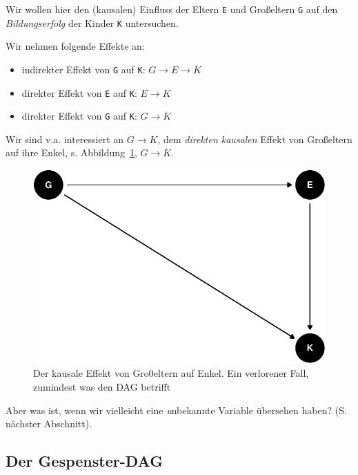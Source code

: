 \documentclass[
  a4paper,
  DIV=11]{scrreprt}
\providecommand{\tightlist}{%
  \setlength{\itemsep}{0pt}\setlength{\parskip}{0pt}}\usepackage{longtable,booktabs,array}
\theoremstyle{definition}
\theoremstyle{remark}
\begin{document}
Wir wollen hier den (kausalen) Einfluss der Eltern \texttt{E} und
Großeltern \texttt{G} auf den \emph{Bildungserfolg} der Kinder
\texttt{K} untersuchen.

Wir nehmen folgende Effekte an:

\begin{itemize}
\tightlist
\item
  indirekter Effekt von \texttt{G} auf \texttt{K}:
  \(G \rightarrow E \rightarrow K\)
\item
  direkter Effekt von \texttt{E} auf \texttt{K}: \(E \rightarrow K\)
\item
  direkter Effekt von \texttt{G} auf \texttt{K}: \(G \rightarrow K\)
\end{itemize}

Wir sind v.a. interessiert an \(G \rightarrow K\), dem \emph{direkten
kausalen} Effekt von Großeltern auf ihre Enkel, s.
Abbildung~\ref{fig-dag-grannies}, \(G \rightarrow K\).

\begin{figure}

{\centering \includegraphics{./kausal_files/figure-pdf/fig-dag-grannies-1.pdf}

}

\caption{\label{fig-dag-grannies}Der kausale Effekt von Gro0eltern auf
Enkel. Ein verlorener Fall, zumindest was den DAG betrifft}

\end{figure}

Aber was ist, wenn wir vielleicht eine \emph{u}nbekannte Variable
übersehen haben? (S. nächster Abschnitt). 👻

\hypertarget{der-gespenster-dag}{%
\subsection{Der Gespenster-DAG}\label{der-gespenster-dag}}
\end{document}
